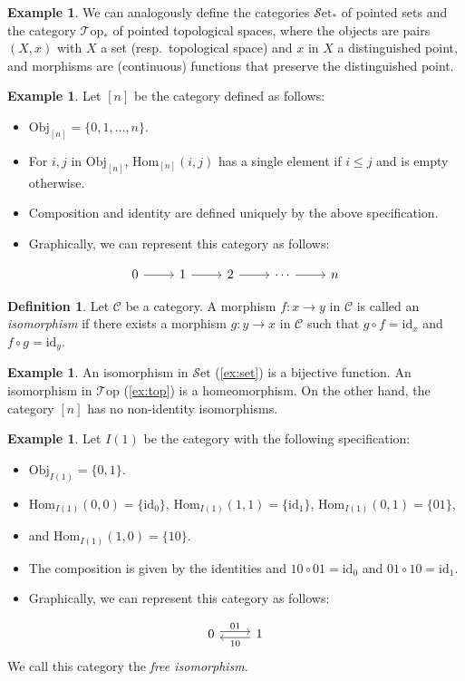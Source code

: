 \documentclass[11pt, a4paper]{amsart}
\newcommand{\cC}{\mathcal{C}}
\newcommand{\Hom}{\mathrm{Hom}}
\newcommand{\Set}{\mathscr{S}\mathrm{et}}
\newcommand{\Top}{\mathscr{T}\mathrm{op}}
\newcommand{\id}{\mathrm{id}}
\newcommand{\Obj}{\mathrm{Obj}}
\theoremstyle{definition}
\newtheorem{definition}[equation]{Definition}
\newtheorem{example}[equation]{Example}
\theoremstyle{remark}
\numberwithin{equation}{section}
\begin{document}
\begin{example} \label{ex:pointed top}
 We can analogously define the categories $\Set_*$ of pointed sets and the category $\Top_*$ of pointed topological spaces, where the objects are pairs $(X,x)$ with $X$ a set (resp.~topological space) and $x$ in $X$ a distinguished point, and morphisms are (continuous) functions that preserve the distinguished point.
\end{example}

\begin{example} \label{ex:ncat}
  Let $[n]$ be the category defined as follows:
  \begin{itemize}
    \item $\Obj_{[n]} = \{ 0, 1, \ldots, n \}$.
    \item For $i,j$ in $\Obj_{[n]}$, $\Hom_{[n]}(i,j)$ has a single element if $i \leq j$ and is empty otherwise.
    \item Composition and identity are defined uniquely by the above specification.
    \item Graphically, we can represent this category as follows:
  \end{itemize}
  \[
  \begin{tikzcd}
  0 \arrow[r] & 1 \arrow[r] & 2 \arrow[r] & \cdots \arrow[r] & n
  \end{tikzcd}
  \]
\end{example}

\begin{definition}
  Let $\cC$ be a category. A morphism $f\colon x \to y$ in $\cC$ is called an \emph{isomorphism} if there exists a morphism $g\colon y \to x$ in $\cC$ such that $g \circ f = \id_x$ and $f \circ g = \id_y$.
\end{definition}

\begin{example} \label{ex:iso in set}
  An isomorphism in $\Set$ (\cref{ex:set}) is a bijective function. An isomorphism in $\Top$ (\cref{ex:top}) is a homeomorphism. On the other hand, the category $[n]$ has no non-identity isomorphisms.
\end{example}

\begin{example} \label{ex:ione}
	Let $I(1)$ be the category with the following specification:
	\begin{itemize}
		\item $\Obj_{I(1)} = \{ 0, 1 \}$.
		\item $\Hom_{I(1)}(0,0) = \{ \id_0 \}$, $\Hom_{I(1)}(1,1) = \{ \id_1	\}$, $\Hom_{I(1)}(0,1) = \{ 01 \}$, 
    \item[] and	$\Hom_{I(1)}(1,0) = \{ 10 \}$.
		\item The composition is given by the identities and $10 \circ 01 = \id_0$ and $01 \circ 10 = \id_1$.
		\item Graphically, we can represent this category as follows:
	\end{itemize}
	\[
	\begin{tikzcd}
	0 \arrow[r, shift left, "01"] & 1 \arrow[l,	shift left, "10"]
	\end{tikzcd}		
\]
 We call this category the \emph{free isomorphism}.
\end{example}
\end{document}
